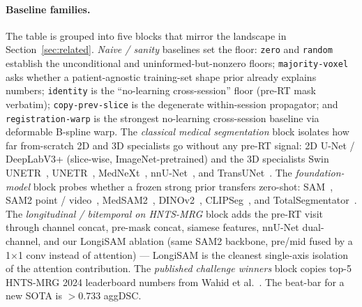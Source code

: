 \paragraph{Baseline families.} The table is grouped into five blocks
that mirror the landscape in Section~\ref{sec:related}. \emph{Naive /
sanity} baselines set the floor: \texttt{zero} and \texttt{random}
establish the unconditional and uninformed-but-nonzero floors;
\texttt{majority-voxel} asks whether a patient-agnostic training-set
shape prior already explains numbers; \texttt{identity} is the
``no-learning cross-session'' floor (pre-RT mask verbatim);
\texttt{copy-prev-slice} is the degenerate within-session propagator;
and \texttt{registration-warp} is the strongest no-learning
cross-session baseline via deformable B-spline warp. The
\emph{classical medical segmentation} block isolates how far
from-scratch 2D and 3D specialists go without any pre-RT signal:
2D U-Net / DeepLabV3+ (slice-wise, ImageNet-pretrained) and the 3D
specialists Swin UNETR~\cite{hatamizadeh2021swinunetr},
UNETR~\cite{hatamizadeh2022unetr}, MedNeXt~\cite{roy2023mednext},
nnU-Net~\cite{isensee2021nnunet}, and
TransUNet~\cite{chen2021transunet}. The \emph{foundation-model} block
probes whether a frozen strong prior transfers zero-shot:
SAM~\cite{kirillov2023sam}, SAM2 point / video~\cite{ravi2024sam2},
MedSAM2~\cite{ma2024medsam2}, DINOv2~\cite{oquab2024dinov2},
CLIPSeg~\cite{lueddecke2022clipseg}, and
TotalSegmentator~\cite{wasserthal2023totalsegmentator}. The
\emph{longitudinal / bitemporal on HNTS-MRG} block adds the pre-RT
visit through channel concat, pre-mask concat, siamese features,
nnU-Net dual-channel, and our LongiSAM ablation (same SAM2 backbone,
pre/mid fused by a 1$\times$1 conv instead of attention) ---
LongiSAM is the cleanest single-axis isolation of the attention
contribution. The \emph{published challenge winners} block copies
top-5 HNTS-MRG 2024 leaderboard numbers from
Wahid et al.~\cite{wahid2024hntsmrg}. The beat-bar for a new SOTA
is $>0.733$ aggDSC.

